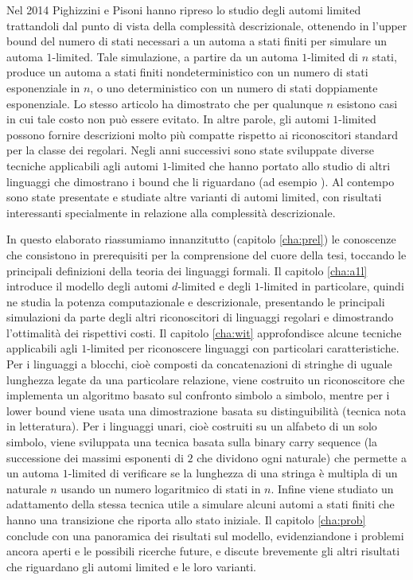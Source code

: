 Nel 2014 Pighizzini e Pisoni hanno ripreso lo studio degli automi limited trattandoli dal punto di vista della complessità descrizionale, ottenendo in \cite{Pighizzini:14:limitedRE} l'upper bound del numero di stati necessari a un automa a stati finiti per simulare un automa $1$-limited. Tale simulazione, a partire da un automa $1$-limited di $n$ stati, produce un automa a stati finiti nondeterministico con un numero di stati esponenziale in $n$, o uno deterministico con un numero di stati doppiamente esponenziale. Lo stesso articolo ha dimostrato che per qualunque $n$ esistono casi in cui tale costo non può essere evitato. In altre parole, gli automi $1$-limited possono fornire descrizioni molto più compatte rispetto ai riconoscitori standard per la classe dei regolari. Negli anni successivi sono state sviluppate diverse tecniche applicabili agli automi $1$-limited che hanno portato allo studio di altri linguaggi che dimostrano i bound che li riguardano (ad esempio \cite{Pighizzini:22:limitedwitness}). Al contempo sono state presentate e studiate altre varianti di automi limited, con risultati interessanti specialmente in relazione alla complessità descrizionale.

In questo elaborato riassumiamo innanzitutto (capitolo \ref{cha:prel}) le conoscenze che consistono in prerequisiti per la comprensione del cuore della tesi, toccando le principali definizioni della teoria dei linguaggi formali. Il capitolo \ref{cha:a1l} introduce il modello degli automi $d$-limited e degli $1$-limited in particolare, quindi ne studia la potenza computazionale e descrizionale, presentando le principali simulazioni da parte degli altri riconoscitori di linguaggi regolari e dimostrando l'ottimalità dei rispettivi costi. Il capitolo \ref{cha:wit} approfondisce alcune tecniche applicabili agli $1$-limited per riconoscere linguaggi con particolari caratteristiche. Per i linguaggi a blocchi, cioè composti da concatenazioni di stringhe di uguale lunghezza legate da una particolare relazione, viene costruito un riconoscitore che implementa un algoritmo basato sul confronto simbolo a simbolo, mentre per i lower bound viene usata una dimostrazione basata su distinguibilità (tecnica nota in letteratura). Per i linguaggi unari, cioè costruiti su un alfabeto di un solo simbolo, viene sviluppata una tecnica basata sulla binary carry sequence (la successione dei massimi esponenti di $2$ che dividono ogni naturale) che permette a un automa $1$-limited di verificare se la lunghezza di una stringa è multipla di un naturale $n$ usando un numero logaritmico di stati in $n$. Infine viene studiato un adattamento della stessa tecnica utile a simulare alcuni automi a stati finiti che hanno una transizione che riporta allo stato iniziale. Il capitolo \ref{cha:prob} conclude con una panoramica dei risultati sul modello, evidenziandone i problemi ancora aperti e le possibili ricerche future, e discute brevemente gli altri risultati che riguardano gli automi limited e le loro varianti.
